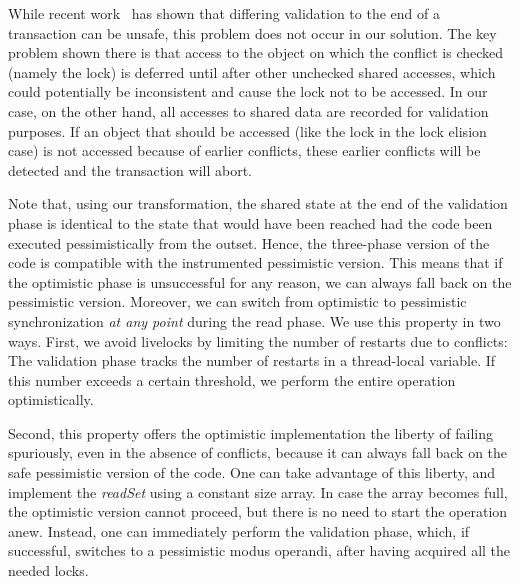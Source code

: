 While recent work~\cite{DiceHKLM14} has shown that differing validation to the end of a transaction can be unsafe, this problem does not occur in our solution. The key problem shown there is that access to the object on which the conflict is checked (namely the lock) is deferred until after other unchecked shared accesses, which could potentially be inconsistent and cause the lock not to be accessed. In our case, on the other hand, all accesses to shared data are recorded for validation purposes. If an object that should be accessed (like the lock in the lock elision case) is not accessed because of earlier conflicts, these earlier conflicts will be detected and the transaction will abort. 

Note that, using our transformation, the shared state at the end of the validation phase
is identical to the state that would have been reached had the code been executed pessimistically from
the outset. Hence, the three-phase version of the code is compatible with the instrumented
pessimistic version. This means that if the optimistic phase is unsuccessful for any reason, we can always
fall back on the pessimistic version. Moreover, we can switch from optimistic to pessimistic synchronization
\emph{at any point} during the read phase.
We use this property in two ways.
First, we avoid livelocks by limiting the number of restarts due to conflicts:
The validation phase tracks the number of restarts in a thread-local variable.
If this number exceeds a certain threshold, we perform the entire operation optimistically.

Second, this property offers the optimistic implementation the liberty of
failing spuriously, even in the absence of conflicts, because it can always fall back on the safe pessimistic version
of the code.
One can take advantage of this liberty, and implement the \emph{readSet} using a constant size array.
In case the array becomes full,  the optimistic version cannot proceed, but there is no 
need to start the operation anew.
Instead, one can immediately perform the validation phase, which, if successful, switches to a pessimistic modus operandi, after having acquired all the needed locks.
